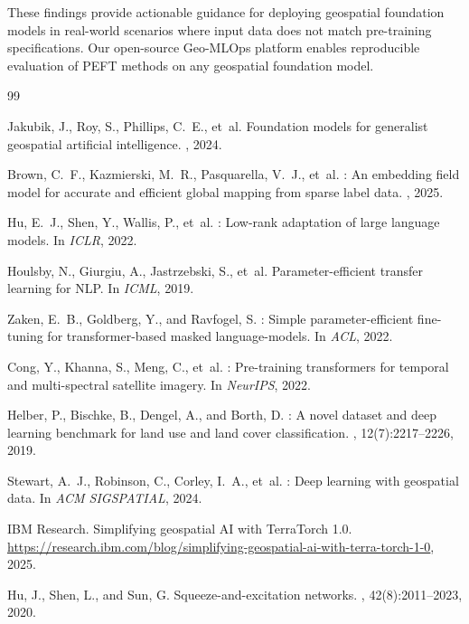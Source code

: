 \documentclass{article}
\begin{document}
These findings provide actionable guidance for deploying geospatial foundation models in real-world scenarios where input data does not match pre-training specifications. Our open-source Geo-MLOps platform enables reproducible evaluation of PEFT methods on any geospatial foundation model.


\begin{thebibliography}{99}

Jakubik, J., Roy, S., Phillips, C.~E., et~al.
\newblock Foundation models for generalist geospatial artificial intelligence.
, 2024.

Brown, C.~F., Kazmierski, M.~R., Pasquarella, V.~J., et~al.
: An embedding field model for accurate and efficient global mapping from sparse label data.
, 2025.

Hu, E.~J., Shen, Y., Wallis, P., et~al.
: Low-rank adaptation of large language models.
\newblock In {\em ICLR}, 2022.

Houlsby, N., Giurgiu, A., Jastrzebski, S., et~al.
\newblock Parameter-efficient transfer learning for {NLP}.
\newblock In {\em ICML}, 2019.

Zaken, E.~B., Goldberg, Y., and Ravfogel, S.
: Simple parameter-efficient fine-tuning for transformer-based masked language-models.
\newblock In {\em ACL}, 2022.

Cong, Y., Khanna, S., Meng, C., et~al.
: Pre-training transformers for temporal and multi-spectral satellite imagery.
\newblock In {\em NeurIPS}, 2022.

Helber, P., Bischke, B., Dengel, A., and Borth, D.
: A novel dataset and deep learning benchmark for land use and land cover classification.
, 12(7):2217--2226, 2019.

Stewart, A.~J., Robinson, C., Corley, I.~A., et~al.
: Deep learning with geospatial data.
\newblock In {\em ACM SIGSPATIAL}, 2024.

IBM Research.
\newblock Simplifying geospatial {AI} with {TerraTorch} 1.0.
\newblock \url{https://research.ibm.com/blog/simplifying-geospatial-ai-with-terra-torch-1-0}, 2025.

Hu, J., Shen, L., and Sun, G.
\newblock Squeeze-and-excitation networks.
, 42(8):2011--2023, 2020.

\end{thebibliography}
\end{document}
